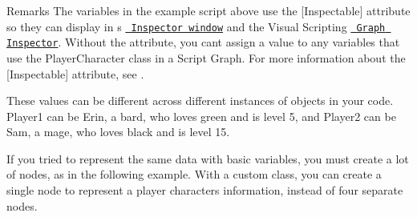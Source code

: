 \begin{DoxyCode}{0}
\DoxyCodeLine{}
\DoxyCodeLine{\{}
\DoxyCodeLine{\ \ \ \ [Inspectable]}
\DoxyCodeLine{\ \ \ \ [Inspectable]}
\DoxyCodeLine{\ \ \ \ [Inspectable]}
\DoxyCodeLine{\ \ \ \ [Inspectable]}
\DoxyCodeLine{\}}

\end{DoxyCode}
 \begin{DoxyRemark}{Remarks}
The variables in the example script above use the {\ttfamily \mbox{[}Inspectable\mbox{]}} attribute so they can display in \textquotesingle{}s \href{https://docs.unity3d.com/Manual/UsingTheInspector.html}{\texttt{ Inspector window}} and the Visual Scripting \href{vs-interface-overview.md\#the-graph-inspector}{\texttt{ Graph Inspector}}. Without the attribute, you can\textquotesingle{}t assign a value to any variables that use the {\ttfamily Player\+Character} class in a Script Graph. For more information about the {\ttfamily \mbox{[}Inspectable\mbox{]}} attribute, see .
\end{DoxyRemark}
These values can be different across different instances of {\ttfamily {}} objects in your code. {\ttfamily Player1} can be Erin, a bard, who loves green and is level 5, and {\ttfamily Player2} can be Sam, a mage, who loves black and is level 15.



If you tried to represent the same data with basic variables, you must create a lot of nodes, as in the following example. With a custom class, you can create a single node to represent a player character\textquotesingle{}s information, instead of four separate nodes.

 